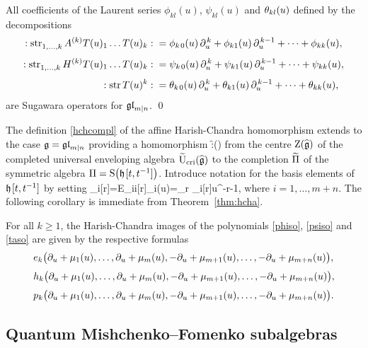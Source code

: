 \documentclass[12pt]{article}
\begin{document}
\bpr\label{prop:sugagln}
All coefficients of the Laurent series
$\phi_{kl}(u)$, $\psi_{kl}(u)$ and $\theta_{kl}(u)$
defined by the decompositions
\begin{align}
:{\rm str}^{}_{1,\dots,k}\, A^{(k)} T(u)_1\dots T(u)_k:{}&=
\phi_{k\hspace{1pt} 0}(u)\,\partial_u^{\hspace{1pt} k}+\phi_{k1}(u)\,\partial_u^{\hspace{1pt} k-1}
+\dots+\phi_{kk}(u),\label{phiso}\\[0.4em]
:{\rm str}^{}_{1,\dots,k}\, H^{(k)} T(u)_1\dots T(u)_k:{}&=
\psi_{k\hspace{1pt} 0}(u)\,\partial_u^{\hspace{1pt} k}+\psi_{k1}(u)\,\partial_u^{\hspace{1pt} k-1}
+\dots+\psi_{kk}(u),\label{psiso}\\[0.4em]
:{\rm str}\, T(u)^k:{}&
= \theta_{k\hspace{1pt} 0}(u)\,\partial_u^{\hspace{1pt} k}+\theta_{k1}(u)\,\partial_u^{\hspace{1pt} k-1} +\dots
+\theta_{kk}(u),\label{taso}
\end{align}
are Sugawara operators for $\mathfrak{gl}_{m|n}$.
\qed
\epr

The definition \eqref{hchcompl} of the affine Harish-Chandra homomorphism
extends to the case $\mathfrak{g}=\mathfrak{gl}_{m|n}$ providing a homomorphism
\ben
\f:\Z(\wh\g)\to \wt\Pi
\een
from the centre ${\rm Z}(\widehat{\mathfrak{g}})$ of the completed universal enveloping algebra $\widetilde{{\rm U}}_{{\rm cri}}(\widehat{\mathfrak{g}})$
to the completion $\widetilde\Pi$ of the symmetric algebra $\Pi={\rm S}\big(\mathfrak h\hspace{1pt}[t,t^{-1}]\big)$.
Introduce notation for the basis elements of $\mathfrak h\hspace{1pt}[t,t^{-1}]$ by setting
\mu_i[r]=E_{ii}[r]\Fand \mu_i(u)=\sum_{r\in\ZZ} \mu_i[r]\tss u^{-r-1},
\eeq
where $i=1,\dots,m+n$.
The following corollary is immediate from Theorem~\ref{thm:hcha}.

\bco\label{cor:hchssgln}
For all $k\geqslant 1$,
the Harish-Chandra images of the polynomials \eqref{phiso},
\eqref{psiso} and \eqref{taso} are given by the respective formulas
\begin{align}
{}&e_k\big(\partial_u+\mu_{1}(u),\dots,\partial_u+\mu_{m}(u),-\partial_u+\mu_{m+1}(u),\dots,-\partial_u+\mu_{m+n}(u)\big),
\nonumber\\[0.3em]
{}&h_k\big(\partial_u+\mu_{1}(u),\dots,\partial_u+\mu_{m}(u),-\partial_u+\mu_{m+1}(u),\dots,-\partial_u+\mu_{m+n}(u)\big),
\nonumber\\[0.3em]
{}&p_k\big(\partial_u+\mu_{1}(u),\dots,\partial_u+\mu_{m}(u),-\partial_u+\mu_{m+1}(u),\dots,-\partial_u+\mu_{m+n}(u)\big).
\nonumber
\end{align}
\eco


\subsection{Quantum Mishchenko--Fomenko subalgebras}
\label{subsec:qmfa}
\end{document}
